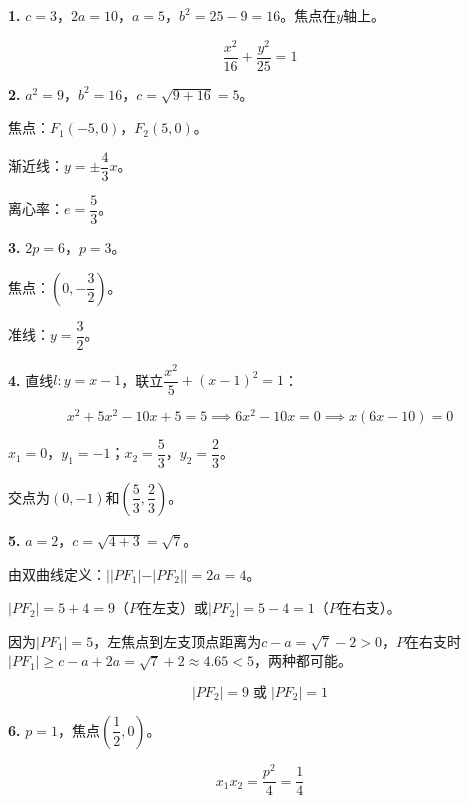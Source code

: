 \documentclass[12pt, a4paper]{ctexart}
\begin{document}
\begin{knowledgebox}[参考答案]

\textbf{1.} $c = 3$，$2a = 10$，$a = 5$，$b^2 = 25 - 9 = 16$。焦点在$y$轴上。

$$\boxed{\dfrac{x^2}{16} + \dfrac{y^2}{25} = 1}$$

\vspace{6pt}

\textbf{2.} $a^2 = 9$，$b^2 = 16$，$c = \sqrt{9+16} = 5$。

焦点：$F_1(-5, 0)$，$F_2(5, 0)$。

渐近线：$y = \pm\dfrac{4}{3}x$。

离心率：$e = \dfrac{5}{3}$。

\vspace{6pt}

\textbf{3.} $2p = 6$，$p = 3$。

焦点：$\left(0, -\dfrac{3}{2}\right)$。

准线：$y = \dfrac{3}{2}$。

\vspace{6pt}

\textbf{4.} 直线$l: y = x - 1$，联立$\dfrac{x^2}{5} + (x-1)^2 = 1$：

$$x^2 + 5x^2 - 10x + 5 = 5 \implies 6x^2 - 10x = 0 \implies x(6x - 10) = 0$$

$x_1 = 0$，$y_1 = -1$；$x_2 = \dfrac{5}{3}$，$y_2 = \dfrac{2}{3}$。

交点为$(0, -1)$和$\left(\dfrac{5}{3}, \dfrac{2}{3}\right)$。

\vspace{6pt}

\textbf{5.} $a = 2$，$c = \sqrt{4+3} = \sqrt{7}$。

由双曲线定义：$||PF_1| - |PF_2|| = 2a = 4$。

$|PF_2| = 5 + 4 = 9$（$P$在左支）或$|PF_2| = 5 - 4 = 1$（$P$在右支）。

因为$|PF_1| = 5$，左焦点到左支顶点距离为$c - a = \sqrt{7} - 2 > 0$，$P$在右支时$|PF_1| \geqslant c - a + 2a = \sqrt{7} + 2 \approx 4.65 < 5$，两种都可能。

$$\boxed{|PF_2| = 9 \;\text{或}\; |PF_2| = 1}$$

\vspace{6pt}

\textbf{6.} $p = 1$，焦点$\left(\dfrac{1}{2}, 0\right)$。

$$x_1 x_2 = \frac{p^2}{4} = \frac{1}{4}$$

\vspace{6pt}


\end{knowledgebox}
\end{document}
